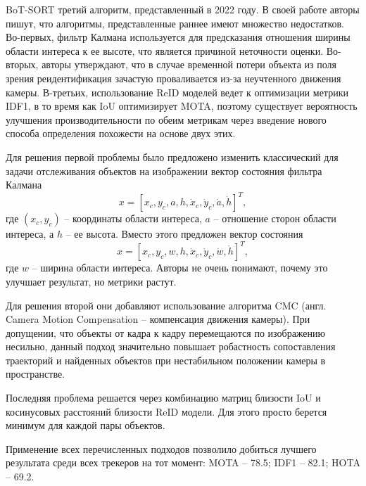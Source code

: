 BoT-SORT \cite{aharon2022bot} третий алгоритм, представленный в 2022 году. 
В своей работе авторы пишут, что алгоритмы, представленные раннее имеют множество недостатков.
Во-первых, фильтр Калмана используется для предсказания отношения ширины области интереса к ее высоте, что является причиной неточности оценки. 
Во-вторых, авторы утверждают, что в случае временной потери объекта из поля зрения реидентификация зачастую проваливается из-за неучтенного движения камеры. 
В-третьих, использование ReID моделей ведет к оптимизации метрики IDF1, в то время как IoU оптимизирует MOTA, поэтому существует вероятность улучшения производительности по обеим метрикам через введение нового способа определения похожести на основе двух этих. 

Для решения первой проблемы было предложено изменить классический для задачи отслеживания объектов на изображении вектор состояния фильтра Калмана 
\begin{equation}
    \label{eq:bot_old_kalman}
    x = [x_c, y_c, a, h, \dot x_c, \dot y_c, \dot a, \dot h]^T,
\end{equation}
где \((x_c, y_c)\) -- координаты области интереса, \(a\) -- отношение сторон области интереса, а \(h\) -- ее высота.
Вместо этого предложен вектор состояния
\begin{equation}
    \label{eq:bot_new_kalman}
    x = [x_c, y_c, w, h, \dot x_c, \dot y_c, \dot w, \dot h]^T,
\end{equation}
где \(w\) -- ширина области интереса. Авторы не очень понимают, почему это улучшает результат, но метрики растут. 

Для решения второй они добавляют использование алгоритма CMC (англ. Camera Motion Compensation -- компенсация движения камеры). При допущении, что объекты от кадра к кадру перемещаются по изображению несильно, данный подход значительно повышает робастность сопоставления траекторий и найденных объектов при нестабильном положении камеры в пространстве. 

Последняя проблема решается через комбинацию матриц близости IoU и косинусовых расстояний близости ReID модели. Для этого просто берется минимум для каждой пары объектов. 

Применение всех перечисленных подходов позволило добиться лучшего результата среди всех трекеров на тот момент: MOTA -- 78.5; IDF1 -- 82.1; HOTA -- 69.2.